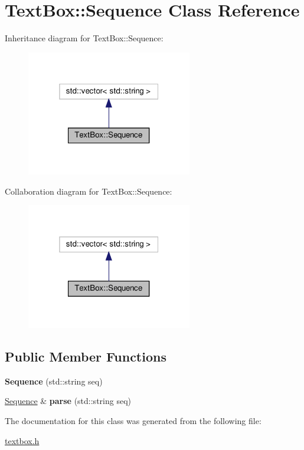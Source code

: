 \hypertarget{a00020}{}\section{Text\+Box\+:\+:Sequence Class Reference}
\label{a00020}


Inheritance diagram for Text\+Box\+:\+:Sequence\+:\nopagebreak
\begin{figure}[H]
\begin{center}
\leavevmode
\includegraphics[width=205pt]{a00019}
\end{center}
\end{figure}


Collaboration diagram for Text\+Box\+:\+:Sequence\+:\nopagebreak
\begin{figure}[H]
\begin{center}
\leavevmode
\includegraphics[width=205pt]{a00018}
\end{center}
\end{figure}
\subsection*{Public Member Functions}
\begin{DoxyCompactItemize}
\item 
\mbox{\label{a00020_a4577eae876f688f54023ad05dc425e9f}} 
{\bfseries Sequence} (std\+::string seq)
\item 
\mbox{\label{a00020_a492e931d8cc0fc9c43af02ae915c313f}} 
\hyperlink{a00020}{Sequence} \& {\bfseries parse} (std\+::string seq)
\end{DoxyCompactItemize}


The documentation for this class was generated from the following file\+:\begin{DoxyCompactItemize}
\item 
\hyperlink{a00005}{textbox.\+h}\end{DoxyCompactItemize}
